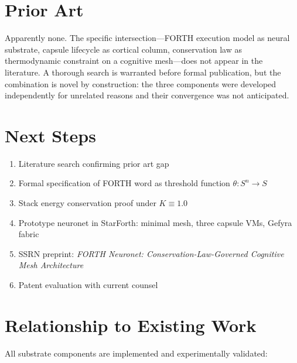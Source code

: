 \documentclass[11pt]{article}
\begin{document}
\section{Prior Art}

Apparently none. The specific intersection---FORTH execution model as neural
substrate, capsule lifecycle as cortical column, conservation law as
thermodynamic constraint on a cognitive mesh---does not appear in the
literature. A thorough search is warranted before formal publication, but
the combination is novel by construction: the three components were
developed independently for unrelated reasons and their convergence was
not anticipated.

\section{Next Steps}

\begin{enumerate}
  \item Literature search confirming prior art gap
  \item Formal specification of FORTH word as threshold function $\theta: S^n \rightarrow S$
  \item Stack energy conservation proof under $K \equiv 1.0$
  \item Prototype neuronet in StarForth: minimal mesh, three capsule VMs,
        Gefyra fabric
  \item SSRN preprint: \emph{FORTH Neuronet: Conservation-Law-Governed
        Cognitive Mesh Architecture}
  \item Patent evaluation with current counsel
\end{enumerate}

\section{Relationship to Existing Work}

All substrate components are implemented and experimentally validated:
\end{document}
